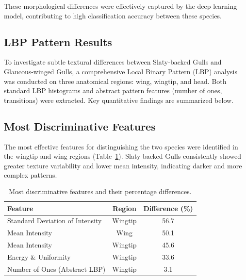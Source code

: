 \documentclass[a4paper,12pt]{report}
\begin{document}
These morphological differences were effectively captured by the deep learning model, contributing to high classification accuracy between these species.


\subsection{LBP Pattern Results}

To investigate subtle textural differences between Slaty-backed Gulls and Glaucous-winged Gulls, a comprehensive Local Binary Pattern (LBP) analysis was conducted on three anatomical regions: wing, wingtip, and head. Both standard LBP histograms and abstract pattern features (number of ones, transitions) were extracted. Key quantitative findings are summarized below.

\subsection{Most Discriminative Features}

The most effective features for distinguishing the two species were identified in the wingtip and wing regions (Table~\ref{tab:feature-diff}). Slaty-backed Gulls consistently showed greater texture variability and lower mean intensity, indicating darker and more complex patterns.


\begin{table}[H]
\centering
\caption{Most discriminative features and their percentage differences.}
\label{tab:feature-diff}
\begin{tabular}{lcc}
\hline
\textbf{Feature} & \textbf{Region} & \textbf{Difference (\%)} \\
\hline
Standard Deviation of Intensity & Wingtip & 56.7 \\
Mean Intensity & Wing & 50.1 \\
Mean Intensity & Wingtip & 45.6 \\
Energy \& Uniformity & Wingtip & 33.6 \\
Number of Ones (Abstract LBP) & Wingtip & 3.1 \\
\hline
\end{tabular}
\end{table}
\end{document}
